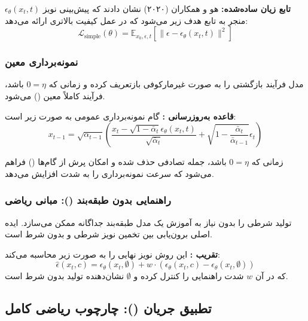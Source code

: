 \begin{latin}
\textbf{تابع زیان ساده‌شده:} هو و همکاران (۲۰۲۰) نشان دادند که پیش‌بینی نویز $\epsilon_\theta(x_t, t)$ منجر به تابع هدف زیر می‌شود که در عمل کیفیت بالاتری ارائه می‌دهد:
\begin{equation}
\mathcal{L}_{\text{simple}}(\theta) = \mathbb{E}_{x_0, \epsilon, t} \left[ \|\epsilon - \epsilon_\theta(x_t, t)\|^2 \right]
\end{equation}


\subsubsection{نمونه‌برداری معین }

مدل  فرآیند بازگشتی را به صورت غیرمارکوفی بازتعریف کرده و زمانی که $0 = \eta$ باشد، فرآیند کاملاً معین () می‌شود.



\textbf{قاعده به‌روزرسانی :} گام نمونه‌برداری عمومی  به صورت زیر است:
\begin{equation}
x_{t-1} = \sqrt{\alpha_{t-1}} \left( \frac{x_t - \sqrt{1 - \bar{\alpha}_t} \epsilon_\theta(x_t, t)}{\sqrt{\bar{\alpha}_t}} + \sqrt{1 - \frac{\bar{\alpha}_t}{\bar{\alpha}_{t-1}}} \epsilon_t \right)
\end{equation}

زمانی که $0 = \eta$ باشد، جمله تصادفی حذف شده و امکان پرش از گام‌ها () فراهم می‌شود که سرعت نمونه‌برداری را به شدت افزایش می‌دهد.

\subsubsection{راهنمایی بدون طبقه‌بند (): مبانی ریاضی}

 تولید شرطی را بدون نیاز به آموزش یک مدل طبقه‌بند جداگانه ممکن می‌سازد. ایده اصلی برون‌یابی بین تخمین نویز شرطی و بدون شرط است.



\textbf{تقریب :} این روش نویز نهایی را به صورت زیر محاسبه می‌کند:
\begin{equation}
\hat{\epsilon}(x_t, c) = \epsilon_\theta(x_t, \emptyset) + w \cdot (\epsilon_\theta(x_t, c) - \epsilon_\theta(x_t, \emptyset))
\end{equation}
که در آن $w$ شدت راهنمایی را کنترل کرده و $\emptyset$ نشان‌دهنده تولید بدون شرط است.

\subsection{تطبیق جریان (): چارچوب ریاضی کامل}


\end{latin}

